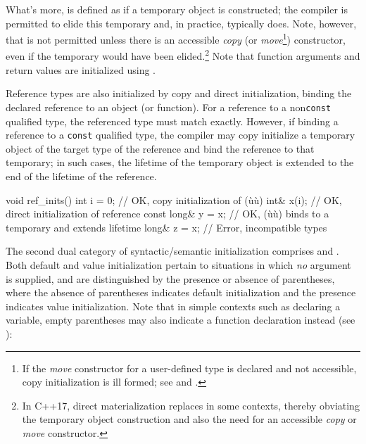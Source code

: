 \noindent What's more,  is defined as if a
temporary object is constructed; the compiler is permitted to elide this
temporary and, in practice, typically does. Note, however, that
 is not permitted unless there is an
accessible \emph{copy} (or \emph{move}{\cprotect\footnote{If the
\emph{move} constructor for a user-defined type is declared and not
accessible, copy initialization is ill formed; see  and .}}) constructor,
even if the temporary would have been elided.{\cprotect\footnote{In
C++17, direct materialization replaces  in some contexts, thereby obviating the temporary
object construction and also the need for an accessible \emph{copy} or
  \emph{move} constructor.}} Note that function arguments and return
values are initialized using .

Reference types are also initialized by copy and direct initialization,
binding the declared reference to an object (or function). For a
reference to a non\lstinline!const! qualified type, the referenced type
must match exactly. However, if binding a reference to a \lstinline!const!
qualified type, the compiler may copy initialize a temporary object of
the target type of the reference and bind the reference to that
temporary; in such cases, the lifetime of the temporary object is
extended to the end of the lifetime of the reference.

\begin{emcppslisting}
void ref_inits()
{
    int i = 0;          // OK, copy initialization of (ù{}ù)
    int& x(i);          // OK, direct initialization of reference
    const long& y = x;  // OK, (ù{}ù) binds to a temporary and extends lifetime
    long& z = x;        // Error, incompatible types
}
\end{emcppslisting}


\noindent The second dual category of syntactic/semantic initialization comprises
 and . Both default and value initialization pertain to
situations in which \emph{no} argument is supplied, and are
distinguished by the presence or absence of parentheses, where the
absence of parentheses indicates default initialization and the presence
indicates value initialization. Note that in simple contexts such as
declaring a variable, empty parentheses may also indicate a function
declaration instead (see ):

